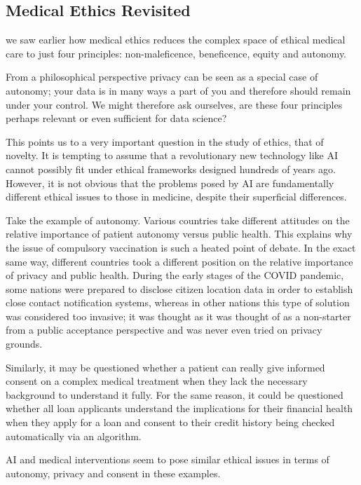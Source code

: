 \documentclass[
]{book}
\theoremstyle{definition}
\theoremstyle{definition}
\theoremstyle{definition}
\theoremstyle{definition}
\theoremstyle{remark}
\begin{document}
\hypertarget{medical-ethics-revisited}{%
\subsection{Medical Ethics Revisited}\label{medical-ethics-revisited}}

we saw earlier how medical ethics reduces the complex space of ethical medical care to just four principles: non-maleficence, beneficence, equity and autonomy.

From a philosophical perspective privacy can be seen as a special case of autonomy; your data is in many ways a part of you and therefore should remain under your control. We might therefore ask ourselves, are these four principles perhaps relevant or even sufficient for data science?

This points us to a very important question in the study of ethics, that of novelty. It is tempting to assume that a revolutionary new technology like AI cannot possibly fit under ethical frameworks designed hundreds of years ago. However, it is not obvious that the problems posed by AI are fundamentally different ethical issues to those in medicine, despite their superficial differences.

Take the example of autonomy. Various countries take different attitudes on the relative importance of patient autonomy versus public health. This explains why the issue of compulsory vaccination is such a heated point of debate. In the exact same way, different countries took a different position on the relative importance of privacy and public health. During the early stages of the COVID pandemic, some nations were prepared to disclose citizen location data in order to establish close contact notification systems, whereas in other nations this type of solution was considered too invasive; it was thought as it was thought of as a non-starter from a public acceptance perspective and was never even tried on privacy grounds.

Similarly, it may be questioned whether a patient can really give informed consent on a complex medical treatment when they lack the necessary background to understand it fully. For the same reason, it could be questioned whether all loan applicants understand the implications for their financial health when they apply for a loan and consent to their credit history being checked automatically via an algorithm.

AI and medical interventions seem to pose similar ethical issues in terms of autonomy, privacy and consent in these examples.
\end{document}
